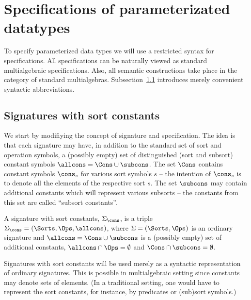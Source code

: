 \section{Specifications of parameterizated datatypes}\label{se:paraADT}
To specify parameterized data types we will use a restricted syntax for
specifications. All specifications can be naturally viewed as standard
multialgebraic specifications. Also, all semantic constructions take place in
the category of standard multialgebras. Subsection~\ref{sub:gsp} introduces
merely convenient syntactic abbreviations. 

\subsection{Signatures with sort constants}\label{sub:gsp}
We start by modifiying the concept of signature and specification. The idea
is that each signature may have, in addition to the standard set of sort and
operation symbols, a (possibly empty) set of distinguished (sort and subsort) constant
symbols $\allcons = \Cons\cup\subcons$. 
The set $\Cons$ %
contains  constant symbols
$\cons_s$ for various sort symbols $s$ -- the intention of $\cons_s$ is to denote all the elements of the respective
sort $s$. 
The set $\subcons$  may contain additional constants
which will represent various subsorts -- the constants from this set are
called ``subsort constants''.
\begin{definition}
\label{def:modsign}
A signature with sort constants, $\Sigma_\cons$, is a triple $\Sigma_\cons =
 (\Sorts,\Ops,\allcons)$, where $\Sigma=(\Sorts,\Ops)$ is an ordinary
 signature and $\allcons=\Cons\cup\subcons$ is a (possibly empty) set of additional constants,
 $\allcons\cap\Ops=\emptyset$ and $\Cons\cap\subcons=\emptyset$. 
\end{definition}
%
Signatures with sort constants will be used merely as a syntactic representation of 
ordinary signatures. This is possible in multialgebraic setting since
constants may denote sets of elements. (In a traditional setting, one would
have to represent the sort constants, for instance, by predicates or (sub)sort symbols.)

